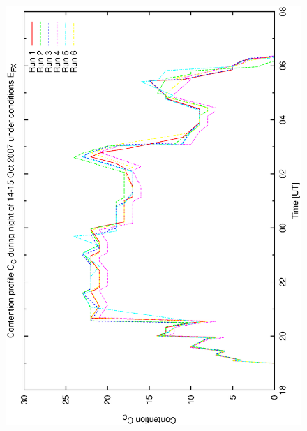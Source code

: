 \begin{figure}[h]
\begin{center}
{   \includegraphics[scale=0.25, angle=-90]{figures/bsa_ex_cont.eps}
  } 
  

\end{center}
\end{figure}
